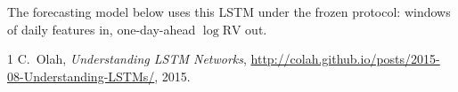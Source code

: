 \documentclass[12pt]{article}
\begin{document}
The forecasting model below uses this LSTM under the frozen protocol: windows of
daily features in, one-day-ahead \(\log\mathrm{RV}\) out.

\begin{thebibliography}{1}
C.~Olah,
\textit{Understanding LSTM Networks},
\url{http://colah.github.io/posts/2015-08-Understanding-LSTMs/},
2015.
\end{thebibliography}
\end{document}
